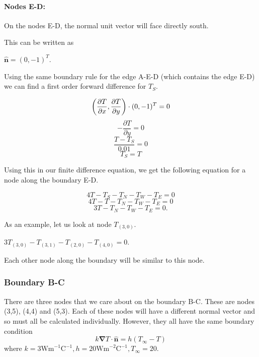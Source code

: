 \documentclass[12pt,a4paper]{article}
\begin{document}
\paragraph*{Nodes E-D:} On the nodes E-D, the normal unit vector will face directly south. 
\begin{center}
\end{center}
This can be written as 
\begin{center}
  $\hat{\textbf{n}}=(0,-1)^T$.
\end{center}
Using the same boundary rule for the edge A-E-D (which contains the edge E-D) we can find a first order forward difference for $T_S$.
\begin{center}
\[\bigg{(}\frac{\partial T}{\partial x},\frac{\partial T}{\partial y}\bigg{)}\cdot (0,-1)^T = 0\]
\[-\frac{\partial T}{\partial y}=0\]
\[\frac{T-T_S}{0.01}=0\]
\[T_S=T\]
\end{center} 
Using this in our finite difference equation, we get the following equation for a node along the boundary E-D.
\begin{center}
  \[4T-T_S-T_N-T_W-T_E=0\]
  \[4T-T-T_N-T_W-T_E=0\]
  \[3T-T_N-T_W-T_E=0.\]
\end{center}
As an example, let us look at node $T_{(3,0)}$.
\begin{center}
  $3T_{(3,0)}-T_{(3,1)}-T_{(2,0)}-T_{(4,0)}=0$.
\end{center}
Each other node along the boundary will be similar to this node.
\subsubsection{Boundary B-C}
There are three nodes that we care about on the boundary B-C. These are nodes (3,5), (4,4) and (5,3). Each of these nodes will have a different normal vector and so must all be calculated individually. However, they all have the same boundary condition 
\[k\boldsymbol{\nabla}T\cdot\hat{\textbf{n}} = h(T_{\infty} - T)\]
where $k=3\text{Wm}^{-1}\text{C}^{-1}, h=20\text{Wm}^{-2}\text{C}^{-1}, T_\infty=20$.
\end{document}
